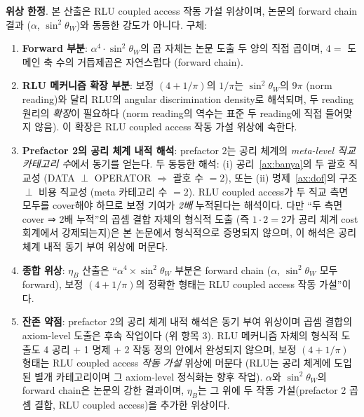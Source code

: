 \documentclass[entropy,article,submit,pdftex,oneauthor]{Definitions/mdpi}
\begin{document}
\textbf{위상 한정}. 본 산출은 RLU coupled access 작동 가설 위상이며, 논문의 forward chain 결과 ($\alpha$, $\sin^2\theta_W$)와 동등한 강도가 아니다. 구체:

\begin{enumerate}
\item \textbf{Forward 부분}: $\alpha^4 \cdot \sin^2\theta_W$의 곱 자체는 논문 도출 두 양의 직접 곱이며, $4 = $ 도메인 축 수의 거듭제곱은 자연스럽다 (forward chain).

\item \textbf{RLU 메커니즘 확장 부분}: 보정 $(4 + 1/\pi)$의 $1/\pi$는 $\sin^2\theta_W$의 $9\pi$ (norm reading)와 달리 RLU의 angular discrimination density로 해석되며, 두 reading 원리의 \emph{확장}이 필요하다 (norm reading의 역수는 표준 두 reading에 직접 들어맞지 않음). 이 확장은 RLU coupled access 작동 가설 위상에 속한다.

\item \textbf{Prefactor 2의 공리 체계 내적 해석}: prefactor $2$는 공리 체계의 \emph{meta-level 직교 카테고리 수}에서 동기를 얻는다. 두 동등한 해석: (i) 공리~\ref{ax:banya}의 두 괄호 직교성 (DATA $\perp$ OPERATOR $\Rightarrow$ 괄호 수 $= 2$), 또는 (ii) 명제~\ref{ax:dof}의 구조 $\perp$ 비용 직교성 (meta 카테고리 수 $= 2$). RLU coupled access가 두 직교 측면 모두를 cover해야 하므로 보정 기여가 \emph{2배} 누적된다는 해석이다. 다만 ``두 측면 cover ⇒ 2배 누적''의 곱셈 결합 자체의 형식적 도출 (즉 $1 \cdot 2 = 2$가 공리 체계 cost 회계에서 강제되는지)은 본 논문에서 형식적으로 증명되지 않으며, 이 해석은 공리 체계 내적 동기 부여 위상에 머문다.

\item \textbf{종합 위상}: $\eta_B$ 산출은 ``$\alpha^4 \times \sin^2\theta_W$ 부분은 forward chain ($\alpha$, $\sin^2\theta_W$ 모두 forward), 보정 $(4 + 1/\pi)$의 정확한 형태는 RLU coupled access 작동 가설''이다.

\item \textbf{잔존 약점}: prefactor 2의 공리 체계 내적 해석은 동기 부여 위상이며 곱셈 결합의 axiom-level 도출은 후속 작업이다 (위 항목 3). RLU 메커니즘 자체의 형식적 도출도 4 공리 + 1 명제 + 2 작동 정의 안에서 완성되지 않으며, 보정 $(4 + 1/\pi)$ 형태는 RLU coupled access \emph{작동 가설} 위상에 머문다 (RLU는 공리 체계에 도입된 별개 카테고리이며 그 axiom-level 정식화는 향후 작업). $\alpha$와 $\sin^2\theta_W$의 forward chain은 논문의 강한 결과이며, $\eta_B$는 그 위에 두 작동 가설(prefactor 2 곱셈 결합, RLU coupled access)을 추가한 위상이다.
\end{enumerate}
\end{document}
